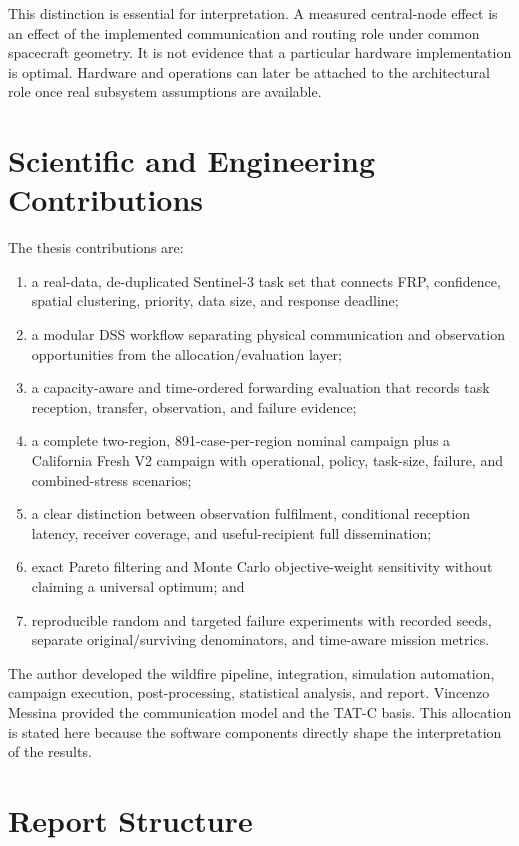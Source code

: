 This distinction is essential for interpretation. A measured central-node effect is an effect of the implemented communication and routing role under common spacecraft geometry. It is not evidence that a particular hardware implementation is optimal. Hardware and operations can later be attached to the architectural role once real subsystem assumptions are available.

\section{Scientific and Engineering Contributions}

The thesis contributions are:

\begin{enumerate}
\item a real-data, de-duplicated Sentinel-3 task set that connects FRP, confidence, spatial clustering, priority, data size, and response deadline;
\item a modular DSS workflow separating physical communication and observation opportunities from the allocation/evaluation layer;
\item a capacity-aware and time-ordered forwarding evaluation that records task reception, transfer, observation, and failure evidence;
\item a complete two-region, 891-case-per-region nominal campaign plus a California Fresh V2 campaign with operational, policy, task-size, failure, and combined-stress scenarios;
\item a clear distinction between observation fulfilment, conditional reception latency, receiver coverage, and useful-recipient full dissemination;
\item exact Pareto filtering and Monte Carlo objective-weight sensitivity without claiming a universal optimum; and
\item reproducible random and targeted failure experiments with recorded seeds, separate original/surviving denominators, and time-aware mission metrics.
\end{enumerate}

The author developed the wildfire pipeline, integration, simulation automation, campaign execution, post-processing, statistical analysis, and report. Vincenzo Messina provided the communication model and the TAT-C basis. This allocation is stated here because the software components directly shape the interpretation of the results.

\section{Report Structure}

